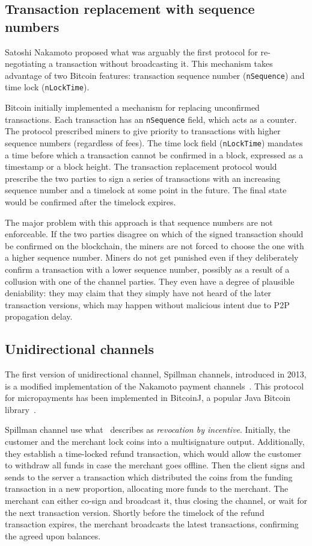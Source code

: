 \subsection{Transaction replacement with sequence numbers}

Satoshi Nakamoto proposed what was arguably the first protocol for re-negotiating a transaction without broadcasting it.
This mechanism takes advantage of two Bitcoin features: transaction sequence number (\texttt{nSequence}) and time lock (\texttt{nLockTime}).

Bitcoin initially implemented a mechanism for replacing unconfirmed transactions.
Each transaction has an \texttt{nSequence} field, which acts as a counter.
The protocol prescribed miners to give priority to transactions with higher sequence numbers (regardless of fees).
The time lock field (\texttt{nLockTime}) mandates a time before which a transaction cannot be confirmed in a block, expressed as a timestamp or a block height.
The transaction replacement protocol would prescribe the two parties to sign a series of transactions with an increasing sequence number and a timelock at some point in the future.
The final state would be confirmed after the timelock expires.

The major problem with this approach is that sequence numbers are not enforceable.
If the two parties disagree on which of the signed transaction should be confirmed on the blockchain, the miners are not forced to choose the one with a higher sequence number.
Miners do not get punished even if they deliberately confirm a transaction with a lower sequence number, possibly as a result of a collusion with one of the channel parties.
They even have a degree of plausible deniability: they may claim that they simply have not heard of the later transaction versions, which may happen without malicious intent due to P2P propagation delay.


\subsection{Unidirectional channels}

The first version of unidirectional channel, Spillman channels, introduced in 2013, is a modified implementation of the Nakamoto payment channels~\cite{Spillman2013}.
This protocol for micropayments has been implemented in BitcoinJ, a popular Java Bitcoin library~\cite{BitcoinJ}.

Spillman channel use what~\cite{Gudgeon2019} describes as \textit{revocation by incentive}.
Initially, the customer and the merchant lock coins into a multisignature output.
Additionally, they establish a time-locked refund transaction, which would allow the customer to withdraw all funds in case the merchant goes offline.
Then the client signs and sends to the server a transaction which distributed the coins from the funding transaction in a new proportion, allocating more funds to the merchant.
The merchant can either co-sign and broadcast it, thus closing the channel, or wait for the next transaction version.
Shortly before the timelock of the refund transaction expires, the merchant broadcasts the latest transactions, confirming the agreed upon balances.

